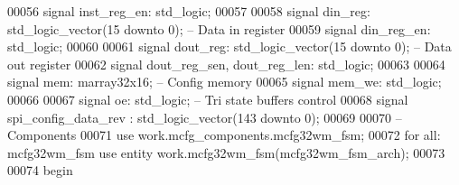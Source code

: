 \begin{DoxyCode}
00056     \textcolor{keywordflow}{signal} \textcolor{vhdlchar}{inst_reg_en}\textcolor{vhdlchar}{:} \textcolor{comment}{std\_logic};
00057 
00058     \textcolor{keywordflow}{signal} \textcolor{vhdlchar}{din_reg}\textcolor{vhdlchar}{:} \textcolor{comment}{std\_logic\_vector}\textcolor{vhdlchar}{(}\textcolor{vhdllogic}{}\textcolor{vhdllogic}{15} \textcolor{keywordflow}{downto} \textcolor{vhdllogic}{}\textcolor{vhdllogic}{0}\textcolor{vhdlchar}{)};\textcolor{keyword}{      -- Data in register}
00059     \textcolor{keywordflow}{signal} \textcolor{vhdlchar}{din_reg_en}\textcolor{vhdlchar}{:} \textcolor{comment}{std\_logic};
00060     
00061     \textcolor{keywordflow}{signal} \textcolor{vhdlchar}{dout_reg}\textcolor{vhdlchar}{:} \textcolor{comment}{std\_logic\_vector}\textcolor{vhdlchar}{(}\textcolor{vhdllogic}{}\textcolor{vhdllogic}{15} \textcolor{keywordflow}{downto} \textcolor{vhdllogic}{}\textcolor{vhdllogic}{0}\textcolor{vhdlchar}{)};\textcolor{keyword}{     -- Data out register}
00062     \textcolor{keywordflow}{signal} \textcolor{vhdlchar}{dout_reg_sen}\textcolor{vhdlchar}{,} \textcolor{vhdlchar}{dout_reg_len}\textcolor{vhdlchar}{:} \textcolor{comment}{std\_logic};
00063     
00064     \textcolor{keywordflow}{signal} \textcolor{vhdlchar}{mem}\textcolor{vhdlchar}{:} \textcolor{vhdlchar}{marray32x16};\textcolor{keyword}{                                    -- Config memory}
00065     \textcolor{keywordflow}{signal} \textcolor{vhdlchar}{mem_we}\textcolor{vhdlchar}{:} \textcolor{comment}{std\_logic};
00066     
00067     \textcolor{keywordflow}{signal} \textcolor{vhdlchar}{oe}\textcolor{vhdlchar}{:} \textcolor{comment}{std\_logic};\textcolor{keyword}{                                       -- Tri state buffers control}
00068     \textcolor{keywordflow}{signal} \textcolor{vhdlchar}{spi_config_data_rev}  \textcolor{vhdlchar}{:} \textcolor{comment}{std\_logic\_vector}\textcolor{vhdlchar}{(}\textcolor{vhdllogic}{}\textcolor{vhdllogic}{143} \textcolor{keywordflow}{downto} \textcolor{vhdllogic}{}\textcolor{vhdllogic}{0}\textcolor{vhdlchar}{)};
00069     
00070 \textcolor{keyword}{    -- Components}
00071 \textcolor{vhdlkeyword}{    use }work.mcfg_components.mcfg32wm\_fsm;
00072     \textcolor{keywordflow}{for} \textcolor{keywordflow}{all}\textcolor{vhdlchar}{:} \textcolor{vhdlchar}{mcfg32wm\_fsm} \textcolor{keywordflow}{use} \textcolor{keywordflow}{entity} \textcolor{vhdlchar}{work}\textcolor{vhdlchar}{.}\textcolor{vhdlchar}{mcfg32wm\_fsm}\textcolor{vhdlchar}{(}\textcolor{vhdlchar}{mcfg32wm\_fsm\_arch}\textcolor{vhdlchar}{)};
00073 
00074 \textcolor{vhdlkeyword}{begin}

\end{DoxyCode}
